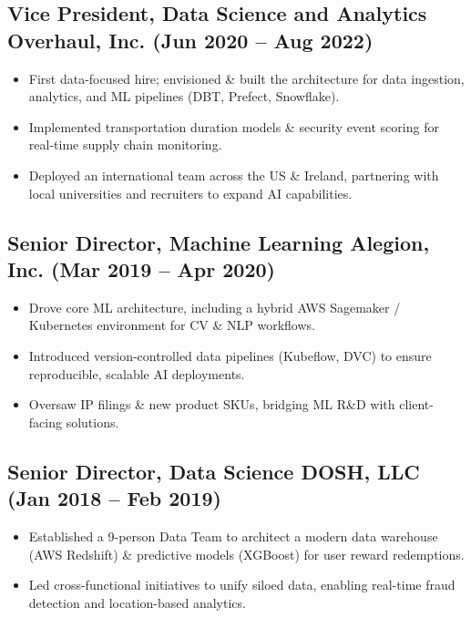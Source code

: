 \documentclass[11pt]{article}
\begin{document}
\subsection*{Vice President, Data Science and Analytics \hfill Overhaul, Inc. (Jun 2020 -- Aug 2022)}
\begin{itemize}[leftmargin=*]
  \item First data-focused hire; envisioned \& built the architecture for data ingestion, analytics, and ML pipelines (DBT, Prefect, Snowflake).
  \item Implemented transportation duration models \& security event scoring for real-time supply chain monitoring.
  \item Deployed an international team across the US \& Ireland, partnering with local universities and recruiters to expand AI capabilities.
\end{itemize}

\subsection*{Senior Director, Machine Learning \hfill Alegion, Inc. (Mar 2019 -- Apr 2020)}
\begin{itemize}[leftmargin=*]
  \item Drove core ML architecture, including a hybrid AWS Sagemaker / Kubernetes environment for CV \& NLP workflows.
  \item Introduced version-controlled data pipelines (Kubeflow, DVC) to ensure reproducible, scalable AI deployments.
  \item Oversaw IP filings \& new product SKUs, bridging ML R\&D with client-facing solutions.
\end{itemize}

\subsection*{Senior Director, Data Science \hfill DOSH, LLC (Jan 2018 -- Feb 2019)}
\begin{itemize}[leftmargin=*]
  \item Established a 9-person Data Team to architect a modern data warehouse (AWS Redshift) \& predictive models (XGBoost) for user reward redemptions.
  \item Led cross-functional initiatives to unify siloed data, enabling real-time fraud detection and location-based analytics.
\end{itemize}
\end{document}
